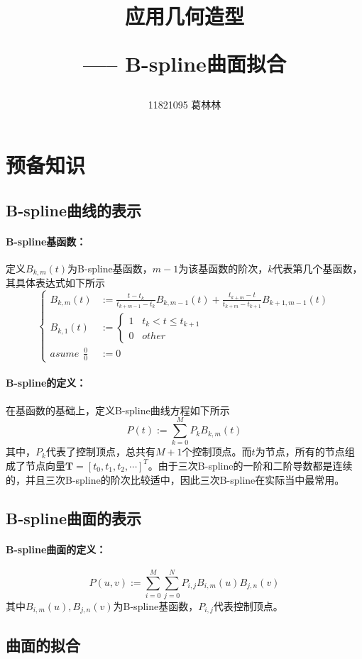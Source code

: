 \documentclass[10pt]{article}
\title{应用几何造型 \hspace{2pt}\hspace{2pt} \begin{large}----- \hspace{2pt} B-spline曲面拟合 \end{large} }
\author{11821095 葛林林}
\begin{document}
\maketitle


\section{预备知识}
\subsection{B-spline曲线的表示}
\paragraph{B-spline基函数：}
定义$B_{k,m}(t)$为B-spline基函数，$m-1$为该基函数的阶次，$k$代表第几个基函数，其具体表达式如下所示
$$
\left\{
\begin{array}{rl}
B_{k,m}(t)&:=\frac{t-t_k}{t_{k+m-1}-t_k}B_{k,m-1}(t)+\frac{t_{k+m}-t}{t_{k+m}-t_{k+1}}B_{k+1,m-1}(t)\\
B_{k,1}(t)&:=
\left\{
\begin{array}{l}
1 \hspace{10pt} t_k<t \leq t_{k+1} \\
0 \hspace{10pt} other
\end{array}
\right.\\
asume \hspace{5pt} \frac{0}{0}&:=0
\end{array}
\right. 
$$
\paragraph{B-spline的定义：}在基函数的基础上，定义B-spline曲线方程如下所示
$$P(t):=\sum_{k=0}^{M}P_kB_{k,m}(t)$$
其中，$P_k$代表了控制顶点，总共有$M+1$个控制顶点。而$t$为节点，所有的节点组成了节点向量$\bm{T}=[t_0,t_1,t_2,\cdots]^T$。由于三次B-spline的一阶和二阶导数都是连续的，并且三次B-spline的阶次比较适中，因此三次B-spline在实际当中最常用。

\subsection{B-spline曲面的表示}
\paragraph{B-spline曲面的定义：}
$$P(u,v):=\sum_{i=0}^{M}\sum_{j=0}^{N}P_{i,j}B_{i,m}(u)B_{j,n}(v)$$
其中$B_{i,m}(u),B_{j,n}(v)$为B-spline基函数，$P_{i,j}$代表控制顶点。

\subsection{曲面的拟合}
\end{document}
